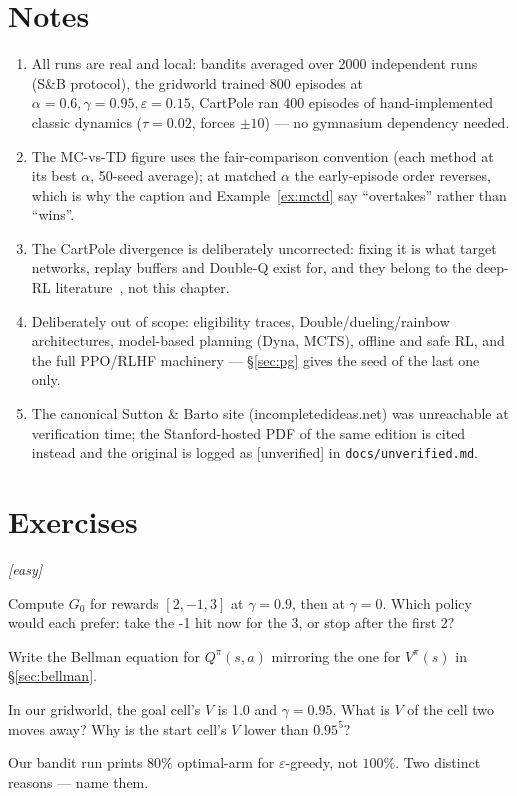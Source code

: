 \section*{Notes}
\begin{enumerate}
\item[\textbf{1.}] All runs are real and local: bandits averaged over
2000 independent runs (S\&B protocol), the gridworld trained 800
episodes at $\alpha{=}0.6, \gamma{=}0.95, \varepsilon{=}0.15$,
CartPole ran 400 episodes of hand-implemented classic dynamics
($\tau{=}0.02$, forces $\pm10$) --- no gymnasium dependency needed.
\item[\textbf{2.}] The MC-vs-TD figure uses the fair-comparison
convention (each method at its best $\alpha$, 50-seed average);
at matched $\alpha$ the early-episode order reverses, which is why
the caption and Example~\ref{ex:mctd} say ``overtakes'' rather than
``wins''.
\item[\textbf{3.}] The CartPole divergence is deliberately uncorrected:
fixing it is what target networks, replay buffers and Double-Q exist
for, and they belong to the deep-RL literature~\cite{spinningup},
not this chapter.
\item[\textbf{4.}] Deliberately out of scope: eligibility traces,
Double/dueling/rainbow architectures, model-based planning
(Dyna, MCTS), offline and safe RL, and the full PPO/RLHF machinery
--- \S\ref{sec:pg} gives the seed of the last one only.
\item[\textbf{5.}] The canonical Sutton \& Barto site
(incompletedideas.net) was unreachable at verification time; the
Stanford-hosted PDF of the same edition is cited instead and the
original is logged as [unverified] in \texttt{docs/}\allowbreak\texttt{unverified.md}.
\end{enumerate}

\section{Exercises}
\label{sec:rlex}

\emph{[easy]}
\begin{exercise}
Compute $G_0$ for rewards $[2,-1,3]$ at $\gamma{=}0.9$, then at
$\gamma{=}0$. Which policy would each prefer: take the -1 hit now for
the 3, or stop after the first 2?
\end{exercise}
\begin{exercise}
Write the Bellman equation for $Q^\pi(s,a)$ mirroring the one for
$V^\pi(s)$ in \S\ref{sec:bellman}.
\end{exercise}
\begin{exercise}
In our gridworld, the goal cell's $V$ is 1.0 and $\gamma{=}0.95$.
What is $V$ of the cell two moves away? Why is the start cell's $V$
lower than $0.95^5$?
\end{exercise}
\begin{exercise}
Our bandit run prints $80\%$ optimal-arm for $\varepsilon$-greedy,
not $100\%$. Two distinct reasons --- name them.
\end{exercise}

